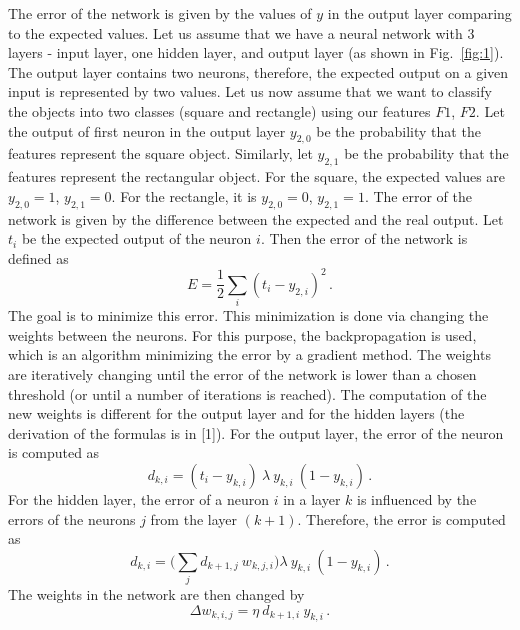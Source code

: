 \documentclass[12pt]{article}
\begin{document}
The error of the network is given by the values of $y$ in the output layer comparing to the expected values.
Let us assume that we have a neural network with $3$ layers - input layer, one hidden layer, and output layer (as shown in Fig.~\ref{fig:1}).
The output layer contains two neurons, therefore, the expected output on a given input is represented by two values.
Let us now assume that we want to classify the objects into two classes (square and rectangle) using our features $F1$, $F2$.
Let the output of first neuron in the output layer $y_{2,0}$ be the probability that the features represent the square object.
Similarly, let $y_{2,1}$ be the probability that the features represent the rectangular object.
For the square, the expected values are $y_{2,0} = 1$, $y_{2,1}=0$.
For the rectangle, it is $y_{2,0} = 0$, $y_{2,1}=1$.
The error of the network is given by the difference between the expected and the real output.
Let $t_i$ be the expected output of the neuron $i$.
Then the error of the network is defined as
\begin{equation}
\label{eq:3}
E = \frac{1}{2} \sum_{i}(t_i - y_{2,i})^2 \, .
\end{equation}
The goal is to minimize this error.
This minimization is done via changing the weights between the neurons.
For this purpose, the backpropagation is used, which is an algorithm minimizing the error by a gradient method.
The weights are iteratively changing until the error of the network is lower than a chosen threshold (or until a number of iterations is reached).
The computation of the new weights is different for the output layer and for the hidden layers (the derivation of the formulas is in [1]).
For the output layer, the error of the neuron is computed as
\begin{equation}
\label{eq:4}
d_{k,i} = (t_{i} - y_{k,i}) \: \lambda \: y_{k,i} \: (1-y_{k,i}) \, .
\end{equation}
For the hidden layer, the error of a neuron $i$ in a layer $k$ is influenced by the errors of the neurons $j$ from the layer $(k+1)$.
Therefore, the error is computed as
\begin{equation}
\label{eq:5}
d_{k,i} = \Big( \sum_j d_{k+1,j} \: w_{k,j,i} \Big) \lambda \: y_{k,i} \: (1-y_{k,i}) \, .
\end{equation}
The weights in the network are then changed by 
\begin{equation}
\label{eq:6}
\Delta w_{k,i,j} = \eta \: d_{k+1,i} \: y_{k,i} \, .
\end{equation}
\end{document}
